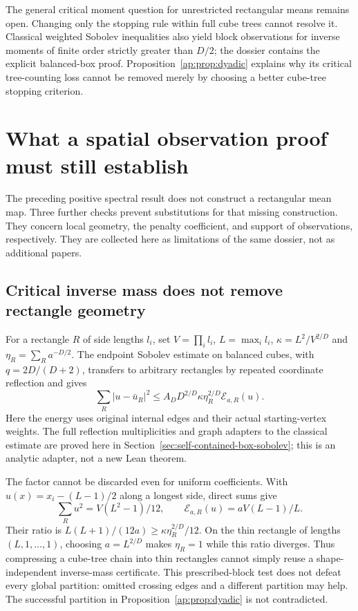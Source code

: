 \documentclass[11pt]{article}
\newcommand{\E}{\mathcal E}
\begin{document}
The general critical moment question for unrestricted rectangular means remains open.
Changing only the stopping rule within full cube trees cannot resolve it. Classical
weighted Sobolev inequalities \cite{ap:ads} also yield block observations for inverse
moments of finite order strictly greater than $D/2$; the dossier contains the explicit
balanced-box proof. Proposition~\ref{ap:prop:dyadic} explains why its critical tree-counting
loss cannot be removed merely by choosing a better cube-tree stopping criterion.

\section{What a spatial observation proof must still establish}
\label{ap:sec:spatial-obstructions}
The preceding positive spectral result does not construct a rectangular mean map.
Three further checks prevent substitutions for that missing construction. They concern
local geometry, the penalty coefficient, and support of observations, respectively.
They are collected here as limitations of the same dossier, not as additional papers.

\subsection{Critical inverse mass does not remove rectangle geometry}
For a rectangle $R$ of side lengths $l_i$, set $V=\prod_i l_i$, $L=\max_i l_i$,
$\kappa=L^2/V^{2/D}$ and $\eta_R=\sum_R a^{-D/2}$. The endpoint Sobolev estimate
on balanced cubes, with $q=2D/(D+2)$, transfers to arbitrary rectangles by repeated
coordinate reflection and gives
\begin{equation}\label{ap:eq:aspect}
 \sum_R|u-\bar u_R|^2\leq A_D D^{2/D}\kappa\eta_R^{2/D}\E_{a,R}(u).
\end{equation}
Here the energy uses original internal edges and their actual starting-vertex weights.
The full reflection multiplicities and graph adapters to the classical estimate
\cite[Section 2.2]{ap:ads} are proved here in Section~\ref{sec:self-contained-box-sobolev}; this is an
analytic adapter, not a new Lean theorem.

The factor cannot be discarded even for uniform coefficients. With $u(x)=x_i-(L-1)/2$
along a longest side, direct sums give
\[
 \sum_Ru^2=V(L^2-1)/12,\qquad
 \E_{a,R}(u)=aV(L-1)/L.
\]
Their ratio is $L(L+1)/(12a)\geq\kappa\eta_R^{2/D}/12$.
On the thin rectangle of lengths $(L,1,\ldots,1)$, choosing $a=L^{2/D}$ makes
$\eta_R=1$ while this ratio diverges. Thus compressing a cube-tree chain into thin
rectangles cannot simply reuse a shape-independent inverse-mass certificate.
This prescribed-block test does not defeat every global partition: omitted crossing
edges and a different partition may help. The successful partition in
Proposition~\ref{ap:prop:dyadic} is not contradicted.
\end{document}
